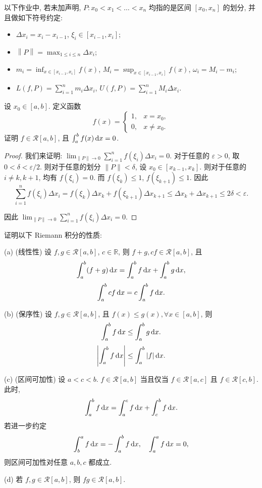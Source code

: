 ﻿\documentclass{article}
\begin{document}
以下作业中, 若未加声明, \( P:x_0<x_1<\dots<x_n \) 均指的是区间 \( [x_0,x_n] \) 的划分, 并且做如下符号约定: 
\begin{itemize}
  \item \( \Delta x_i=x_i-x_{i-1} \), \( \xi_i \in [x_{i-1}, x_i] \);
  \item \( \left\|P\right\|=\max_{1\le i \le n} \Delta x_i \); 
  \item \( m_i=\inf_{x \in [x_{i-1}, x_i]} f(x) \), \( M_i=\sup_{x \in [x_{i-1}, x_i]} f(x) \), \( \omega_i=M_i-m_i \);
  \item \( L(f, P)=\sum_{i=1}^{n} m_i \Delta x_i \), \( U(f, P)=\sum_{i=1}^{n} M_i \Delta x_i \).
\end{itemize}

\begin{problem}
设 $x_0 \in [a, b]$. 定义函数
\[ 
f(x) = \begin{cases} 1, & x = x_0, \\ 0, & x \neq x_0. \end{cases} 
\]
证明 $f \in \mathscr{R}[a, b]$, 且 $\int_a^b f(x) \,\mathrm{d} x = 0$.
\end{problem}

\begin{proof}
  我们来证明: \( \lim_{\|P\|\to 0}\sum_{i=1}^{n}f(\xi_i)\Delta x_i = 0 \). 对于任意的 \( \varepsilon>0 \), 取 \( 0<\delta<\varepsilon/2 \). 则对于任意的划分 \( \|P\|<\delta \), 设 \( x_0\in[x_{k-1},x_k] \). 则对于任意的 \( i\ne k,k+1 \), 均有 \( f(\xi_i)=0 \). 而 \( f(\xi_k)\le 1 \), \( f(\xi_{k+1})\le 1 \). 因此
  \[ \sum_{i=1}^{n}f(\xi_i)\Delta x_i = f(\xi_k)\Delta x_k + f(\xi_{k+1})\Delta x_{k+1} \le \Delta x_k + \Delta x_{k+1} \le 2\delta < \varepsilon. \]

  因此 \( \lim_{\|P\|\to 0}\sum_{i=1}^{n}f(\xi_i)\Delta x_i = 0 \).
\end{proof}



\begin{problem}
证明以下 Riemann 积分的性质:

(a) (线性性) 设 $f, g \in \mathscr{R}[a, b]$, $c \in \mathbb{R}$, 则 $f + g, cf \in \mathscr{R}[a, b]$, 且
\[ \int_a^b (f + g) \,\mathrm{d} x = \int_a^b f \,\mathrm{d} x + \int_a^b g \,\mathrm{d} x, \]
\quad
\[ \int_a^b cf \,\mathrm{d} x = c \int_a^b f \,\mathrm{d} x. \]

(b) (保序性) 设 $f, g \in \mathscr{R}[a, b]$, 且 $f(x) \le g(x), \forall x \in [a, b]$, 则
\[ \int_a^b f \,\mathrm{d} x \le \int_a^b g \,\mathrm{d} x. \]
 \quad
\[ \left| \int_a^b f \,\mathrm{d} x \right| \le \int_a^b |f| \,\mathrm{d} x. \]

(c) (区间可加性) 设 $a < c < b$. $f \in \mathscr{R}[a, b]$ 当且仅当 $f \in \mathscr{R}[a, c]$ 且 $f \in \mathscr{R}[c, b]$. 此时,
\[ \int_a^b f \,\mathrm{d} x = \int_a^c f \,\mathrm{d} x + \int_c^b f \,\mathrm{d} x. \]
若进一步约定
\[ \int_b^a f \,\mathrm{d} x = - \int_a^b f \,\mathrm{d} x, \quad \int_a^a f \,\mathrm{d} x = 0, \]
则区间可加性对任意 $a, b, c$ 都成立.

(d) 若 $f, g \in \mathscr{R}[a, b]$, 则 $fg \in \mathscr{R}[a, b]$.
\end{problem}
\end{document}
